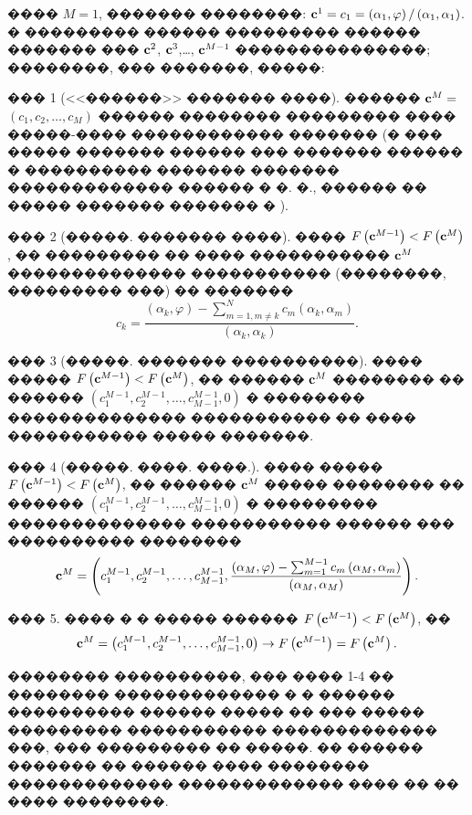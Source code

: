 \documentclass[a4paper]{article}
\begin{document}
���� $M=1$, ������� ��������: ${\bf c}^1=c_1=\left({\alpha }_1,\varphi \right)/\left({\alpha }_1,{\alpha }_1\right)$. � ��������� ������ ��������� ������ ������� ��� ${\bf c}^2$, ${\bf c}^3$,{\dots}, ${\bf c}^{M-1}$ ���������������; ��������, ��� �������, �����:

  ��� 1 (<<������>> ������� ����).
        ������ ${\bf c}^M=$$\left(c_1,c_2,\dots ,c_M\right)$ ������ �������� ��������� ���� �����-���� ������������ ������� (� ��� ����� ������� ������ ��� ������� ������ � ���������� ������� ������� ������������� ������ � �. �., ������ �� ����� ������� ������� � \cite{verzh1}).

        ��� 2 (�����. ������� ����). ���� $F\left({\bf c}^{M-1}\right)<F\left({\bf c}^M\right)$, �� ��������� �� ���� ����������� ${\bf c}^M$ �������������� ����������� (��������, ��������� ���) �� �������
        \begin{equation}
          c_k=\frac{\left({\alpha }_k,\varphi \right)-\sum^N_{m=1,m\neq k}{c_m}\left({\alpha }_k,{\alpha }_m\right)}{\left({\alpha }_k,{\alpha }_k\right)}.
        \end{equation}

  ��� 3 (�����. ������� ����������). ���� ����� $F\left({\bf c}^{M-1}\right)<F\left({\bf c}^M\right)$, �� ������ ${\bf c}^M$ �������� �� ������ $\left(c^{M-1}_1,c^{M-1}_2,\dots ,c^{M-1}_{M-1},0\right)$ � �������� �������������� ����������� �� ���� ����������� ����� �������.

 ��� 4 (�����. ����. ����.). ���� ����� $F\left({\bf c}^{M-1}\right)<F\left({\bf c}^M\right)$, �� ������ ${\bf c}^M$ ����� �������� �� ������ $\left(c^{M-1}_1,c^{M-1}_2,\dots ,c^{M-1}_{M-1},0\right)$ � ��������� �������������� ����������� ������ ��� ���������� ��������
        \begin{equation}{\bf c}^M=\left(c^{M-1}_1,c^{M-1}_2,\dots ,c^{M-1}_{M-1},\frac{\left({\alpha }_M,\varphi \right)-\sum^{M-1}_{m=1}{c_m}\left({\alpha }_M,{\alpha }_m\right)}{\left({\alpha }_M,{\alpha }_M\right)}\right).\end{equation}

  ��� 5. ���� � � ����� ������ $F\left({\bf c}^{M-1}\right)<F\left({\bf c}^M\right)$, ��
        \begin{equation}{\bf c}^M=\left(c^{M-1}_1,c^{M-1}_2,\dots ,c^{M-1}_{M-1},0\right)\to F\left({\bf c}^{M-1}\right)=F\left({\bf c}^M\right).\end{equation}

�������� ����������, ��� ���� 1-4 �� �������� ������������� � � ������ ���������� ������ ����� �� ��� ����� ��������� ����������� ������������� ���, ��� ��������� �� �����.
�� ������ ������� �� ������ ���� �������� ������������� ������������� ���� �� �� ���� ��������.
\end{document}
